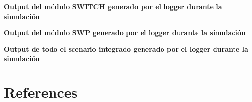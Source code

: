 \documentclass[10pt,a4paper]{article}
\begin{document}
\textbf{Output del módulo SWITCH generado por el logger durante la simulación}


\textbf{Output del módulo SWP generado por el logger durante la simulación}


\textbf{Output de todo el scenario integrado generado por el logger durante la simulación}


\section{References}


\end{document}
